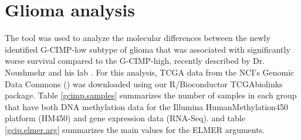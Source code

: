 
\section{Glioma analysis}

The  tool was used to analyze the molecular differences between the newly identified G-CIMP-low subtype of glioma that was associated with significantly worse survival compared to the G-CIMP-high, recently described by Dr. Noushmehr and his lab \cite{cell}. 
For this analysis, TCGA data from the NCI's Genomic Data Commons () was downloaded using our R/Bioconductor TCGAbiolinks package. Table \ref{gcimp.samples} summarizes the number of samples in each group that have both DNA methylation data for the Illumina HumanMethylation450 platform (HM450) and gene expression data
(RNA-Seq). and table \ref{gcip.elmer.arg} summarizes the main values for the ELMER arguments.

